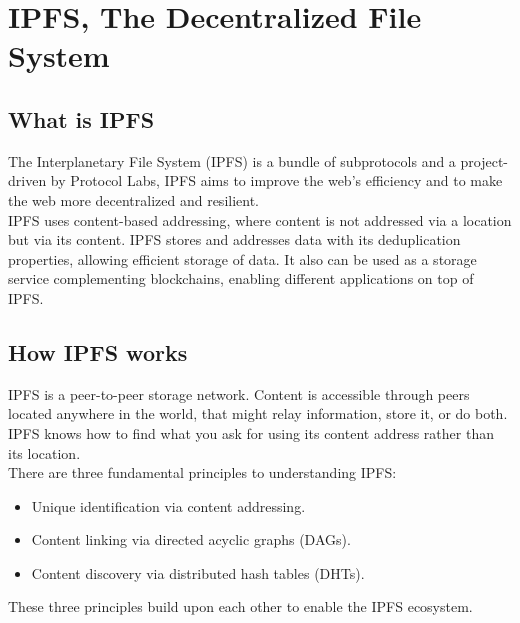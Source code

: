 
\section{IPFS, The Decentralized File System}

\subsection{What is IPFS}

The Interplanetary File System (IPFS) is a bundle of subprotocols and a project-driven by Protocol Labs, IPFS aims to improve the web’s efficiency and to make the web more decentralized and resilient. \\[-8pt]

IPFS uses content-based addressing, where content is not addressed via a location but via its content. IPFS stores and addresses data with its deduplication properties, allowing efficient storage of data. It also can be used as a storage service complementing blockchains, enabling different applications on top of IPFS. \\[-8pt]

\subsection{How IPFS works}

IPFS is a peer-to-peer storage network. Content is accessible through peers located anywhere in the world, that might relay information, store it, or do both. IPFS knows how to find what you ask for using its content address rather than its location. \\[-8pt]

\noindent
There are three fundamental principles to understanding IPFS: \\

\begin{itemize}
\item Unique identification via content addressing.
\item Content linking via directed acyclic graphs (DAGs).
\item Content discovery via distributed hash tables (DHTs).
\end{itemize}

These three principles build upon each other to enable the IPFS ecosystem.



